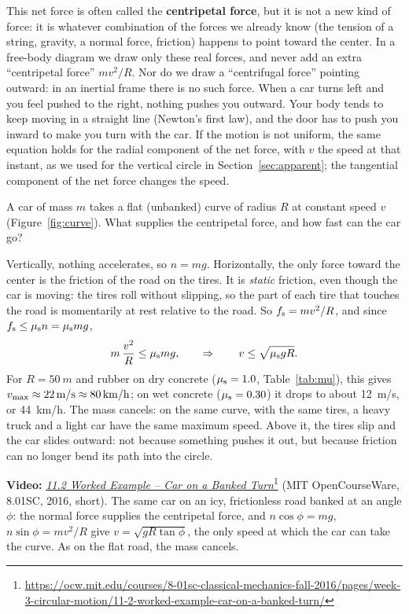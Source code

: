 \documentclass[11pt,a4paper]{article}
\begin{document}
This net force is often called the \textbf{centripetal force}, but it is not a new kind of force: it is
whatever combination of the forces we already know (the tension of a string, gravity, a normal force,
friction) happens to point toward the center. In a free-body diagram we draw only these real forces,
and never add an extra ``centripetal force'' $mv^2/R$. Nor do we draw a ``centrifugal force'' pointing
outward: in an inertial frame there is no such force. When a car turns left and you feel pushed to the
right, nothing pushes you outward. Your body tends to keep moving in a straight line (Newton's first
law), and the door has to push you inward to make you turn with the car. If the motion is not uniform,
the same equation holds for the radial component of the net force, with $v$ the speed at that instant,
as we used for the vertical circle in Section~\ref{sec:apparent}; the tangential component of the net
force changes the speed.

\begin{example}
\setlength{\parskip}{0.5em plus 0.1em}%
A car of mass $m$ takes a flat (unbanked) curve of radius $R$ at constant speed $v$
(Figure~\ref{fig:curve}). What supplies the centripetal force, and how fast can the car go?

Vertically, nothing accelerates, so $n = mg$. Horizontally, the only force toward the center is the
friction of the road on the tires. It is \emph{static} friction, even though the car is moving: the
tires roll without slipping, so the part of each tire that touches the road is momentarily at rest
relative to the road. So $f_{\mathrm{s}} = mv^2/R$, and since $f_{\mathrm{s}} \leq \mu_{\mathrm{s}} n = \mu_{\mathrm{s}} mg$,
\[
  m\,\frac{v^2}{R} \leq \mu_{\mathrm{s}} mg , \qquad \Rightarrow \qquad v \leq \sqrt{\mu_{\mathrm{s}} g R} .
\]
For $R = \qty{50}{m}$ and rubber on dry concrete ($\mu_{\mathrm{s}} = 1.0$, Table~\ref{tab:mu}), this gives
$v_{\mathrm{max}} \approx \qty{22}{m/s} \approx \qty{80}{km/h}$; on wet concrete ($\mu_{\mathrm{s}} = 0.30$) it
drops to about \qty{12}{m/s}, or \qty{44}{km/h}. The mass
cancels: on the same curve, with the same tires, a heavy truck and a light car have the same maximum
speed. Above it, the tires slip and the car slides outward: not because something pushes it out, but
because friction can no longer bend its path into the circle.
\end{example}

\begin{aside}
\textbf{Video:}
\href{https://ocw.mit.edu/courses/8-01sc-classical-mechanics-fall-2016/pages/week-3-circular-motion/11-2-worked-example-car-on-a-banked-turn/}{\emph{11.2
Worked Example -- Car on a Banked
Turn}}\footnote{\url{https://ocw.mit.edu/courses/8-01sc-classical-mechanics-fall-2016/pages/week-3-circular-motion/11-2-worked-example-car-on-a-banked-turn/}}
(MIT OpenCourseWare, 8.01SC, 2016, short). The same car on an icy, frictionless road banked at an
angle $\phi$: the normal force supplies the centripetal force, and $n\cos\phi = mg$,
$n\sin\phi = mv^2/R$ give $v = \sqrt{gR\tan\phi}$, the only speed at which the car can take the
curve. As on the flat road, the mass cancels.
\end{aside}
\end{document}
